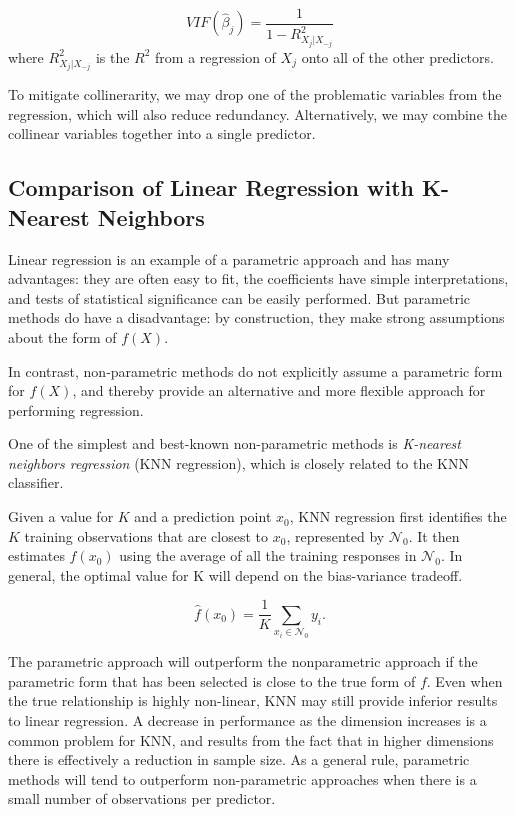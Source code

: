 \documentclass{article}
\numberwithin{equation}{section}
\begin{document}
\begin{enumerate}
    \begin{equation}
        VIF(\hat \beta_j ) = \frac{1}{1-R^2_{X_j|X_{-j}}}
    \end{equation}
    where $R^2_{X_j|X_{-j}}$ is the $R^2$ from a regression of $X_j$ onto all of the other predictors.
    
    To mitigate collinerarity, we may drop one of the problematic variables from the regression, which will also reduce redundancy. Alternatively, we may combine the collinear variables together into a single predictor.
    
\subsection{Comparison of Linear Regression with K-Nearest Neighbors}
Linear regression is an example of a parametric approach and has many advantages: they are often easy to fit, the coefficients have simple interpretations, and tests of statistical significance can be easily performed. But parametric methods do have a disadvantage: by construction, they make strong assumptions about the form of $f(X)$. 

In contrast, non-parametric methods do not explicitly assume a parametric form for $f(X)$, and thereby provide an alternative and more flexible approach for performing regression. 

One of the simplest and best-known non-parametric methods is \textit{K-nearest neighbors regression} (KNN regression), which is closely related to the KNN classifier.

Given a value for $K$ and a prediction point $x_0$, KNN regression first identifies the $K$ training observations that are closest to $x_0$, represented by $\mathcal N_0$. It then estimates $f(x_0)$ using the average of all the training responses in $\mathcal N_0$. In general, the optimal value for K will depend on the bias-variance tradeoff.

\begin{equation}
    \hat f (x_0) = \frac{1}{K} \sum_{x_i \in \mathcal N_0} y_i.
\end{equation}

The parametric approach will outperform the nonparametric approach if the parametric form that has been selected is close to the true form of $f$. Even when the true relationship is highly non-linear, KNN may still provide inferior results to linear regression. A decrease in performance as the dimension increases is a common problem for KNN, and results from the fact that in higher dimensions there is effectively a reduction in sample size. As a general rule, parametric methods will tend to outperform non-parametric approaches when there is a small number of observations per predictor.


\end{enumerate}
\end{document}
